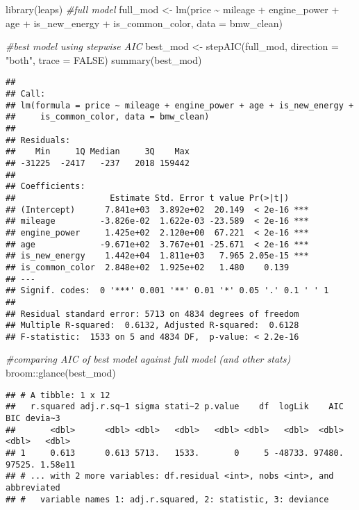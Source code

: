 \documentclass[
]{article}
\newenvironment{Shaded}{\begin{snugshade}}{\end{snugshade}}
\newcommand{\AttributeTok}[1]{\textcolor[rgb]{0.77,0.63,0.00}{#1}}
\newcommand{\CommentTok}[1]{\textcolor[rgb]{0.56,0.35,0.01}{\textit{#1}}}
\newcommand{\ConstantTok}[1]{\textcolor[rgb]{0.00,0.00,0.00}{#1}}
\newcommand{\FunctionTok}[1]{\textcolor[rgb]{0.00,0.00,0.00}{#1}}
\newcommand{\NormalTok}[1]{#1}
\newcommand{\OtherTok}[1]{\textcolor[rgb]{0.56,0.35,0.01}{#1}}
\newcommand{\SpecialCharTok}[1]{\textcolor[rgb]{0.00,0.00,0.00}{#1}}
\newcommand{\StringTok}[1]{\textcolor[rgb]{0.31,0.60,0.02}{#1}}
\begin{document}
\begin{Shaded}
\begin{Highlighting}[]
\FunctionTok{library}\NormalTok{(leaps)}
\CommentTok{\#full model}
\NormalTok{full\_mod }\OtherTok{\textless{}{-}} \FunctionTok{lm}\NormalTok{(price }\SpecialCharTok{\textasciitilde{}}\NormalTok{ mileage }\SpecialCharTok{+}\NormalTok{ engine\_power }\SpecialCharTok{+}\NormalTok{ age }\SpecialCharTok{+}\NormalTok{ is\_new\_energy }\SpecialCharTok{+}\NormalTok{ is\_common\_color, }\AttributeTok{data =}\NormalTok{ bmw\_clean)}

\CommentTok{\#best model using stepwise AIC}
\NormalTok{best\_mod }\OtherTok{\textless{}{-}} \FunctionTok{stepAIC}\NormalTok{(full\_mod, }\AttributeTok{direction =} \StringTok{"both"}\NormalTok{, }\AttributeTok{trace =} \ConstantTok{FALSE}\NormalTok{)}
\FunctionTok{summary}\NormalTok{(best\_mod)}
\end{Highlighting}
\end{Shaded}

\begin{verbatim}
## 
## Call:
## lm(formula = price ~ mileage + engine_power + age + is_new_energy + 
##     is_common_color, data = bmw_clean)
## 
## Residuals:
##    Min     1Q Median     3Q    Max 
## -31225  -2417   -237   2018 159442 
## 
## Coefficients:
##                   Estimate Std. Error t value Pr(>|t|)    
## (Intercept)      7.841e+03  3.892e+02  20.149  < 2e-16 ***
## mileage         -3.826e-02  1.622e-03 -23.589  < 2e-16 ***
## engine_power     1.425e+02  2.120e+00  67.221  < 2e-16 ***
## age             -9.671e+02  3.767e+01 -25.671  < 2e-16 ***
## is_new_energy    1.442e+04  1.811e+03   7.965 2.05e-15 ***
## is_common_color  2.848e+02  1.925e+02   1.480    0.139    
## ---
## Signif. codes:  0 '***' 0.001 '**' 0.01 '*' 0.05 '.' 0.1 ' ' 1
## 
## Residual standard error: 5713 on 4834 degrees of freedom
## Multiple R-squared:  0.6132, Adjusted R-squared:  0.6128 
## F-statistic:  1533 on 5 and 4834 DF,  p-value: < 2.2e-16
\end{verbatim}

\begin{Shaded}
\begin{Highlighting}[]
\CommentTok{\#comparing AIC of best model against full model (and other stats)}
\NormalTok{broom}\SpecialCharTok{::}\FunctionTok{glance}\NormalTok{(best\_mod)}
\end{Highlighting}
\end{Shaded}

\begin{verbatim}
## # A tibble: 1 x 12
##   r.squared adj.r.sq~1 sigma stati~2 p.value    df  logLik    AIC    BIC devia~3
##       <dbl>      <dbl> <dbl>   <dbl>   <dbl> <dbl>   <dbl>  <dbl>  <dbl>   <dbl>
## 1     0.613      0.613 5713.   1533.       0     5 -48733. 97480. 97525. 1.58e11
## # ... with 2 more variables: df.residual <int>, nobs <int>, and abbreviated
## #   variable names 1: adj.r.squared, 2: statistic, 3: deviance
\end{verbatim}
\end{document}
